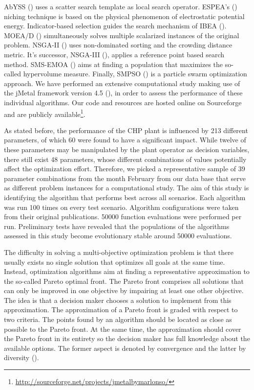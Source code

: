 AbYSS (\cite{abyss}) uses a scatter search template as local search operator. ESPEA's (\cite{espea}) niching technique is based on the physical phenomenon of electrostatic potential energy. Indicator-based selection guides the search mechanism of IBEA (\cite{ibea}). MOEA/D (\cite{moead2009}) simultaneously solves multiple scalarized instances of the original problem. NSGA-II (\cite{nsga2}) uses non-dominated sorting and the crowding distance metric. It's successor, NSGA-III (\cite{nsga3part1}), applies a reference point based search method. SMS-EMOA (\cite{smsemoa}) aims at finding a population that maximizes the so-called hypervolume measure. Finally, SMPSO (\cite{smpso}) is a particle swarm optimization approach. We have performed an extensive computational study making use of the jMetal framework version 4.5 (\cite{jmetal2}), in order to assess the performance of these individual algorithms. Our code and resources are hosted online on Sourceforge and are publicly available\footnote{\url{http://sourceforge.net/projects/jmetalbymarlonso/}}.

As stated before, the performance of the CHP plant is influenced by 213 different parameters, of which 60 were found to have a significant impact. While twelve of these parameters may be manipulated by the plant operator as decision variables, there still exist 48 parameters, whose different combinations of values potentially affect the optimization effort. Therefore, we picked a representative sample of 39 parameter combinations from the month February from our data base that serve as different problem instances for a computational study. The aim of this study is identifying the algorithm that performs best across all scenarios. Each algorithm was run 100 times on every test scenario. Algorithm configurations were taken from their original publications. \num{50000} function evaluations were performed per run. Preliminary tests have revealed that the populations of the algorithms assessed in this study become evolutionary stable around \num{50000} evaluations.

The difficulty in solving a multi-objective optimization problem is that there usually exists no single solution that optimizes all goals at the same time. Instead, optimization algorithms aim at finding a representative approximation to the so-called Pareto optimal front. The Pareto front comprises all solutions that can only be improved in one objective by impairing at least one other objective. The idea is that a decision maker chooses a solution to implement from this approximation. The approximation of a Pareto front is graded with respect to two criteria. The points found by an algorithm should be located as close as possible to the Pareto front. At the same time, the approximation should cover the Pareto front in its entirety so the decision maker has full knowledge about the available options. The former aspect is denoted by convergence and the latter by diversity (\cite{basicDeb,basicCoello}).

